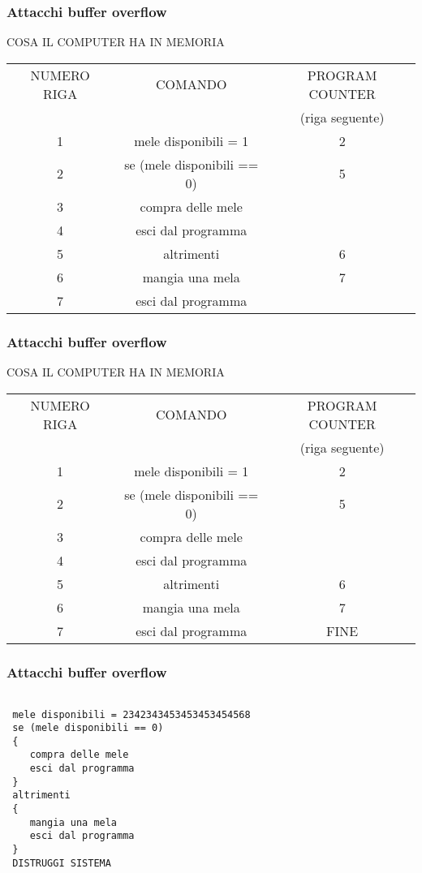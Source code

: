 \documentclass[italian,aspectratio=169]{beamer}
\begin{document}
\begin{frame}
 \frametitle{Attacchi buffer overflow}
 COSA IL COMPUTER HA IN MEMORIA
 \begin{center}
 \begin{tabular}{|c|c|c|}
\hline 
{NUMERO RIGA} & {COMANDO} & {PROGRAM COUNTER}\tabularnewline
{}&{}&{(riga seguente)}\tabularnewline
\hline 
\hline 
{1} & {mele disponibili = 1} & {2}\tabularnewline
\hline
{2} & {se (mele disponibili == 0)} & {5}\tabularnewline
\hline
{3} & {compra delle mele} & {}\tabularnewline
\hline
{4} & {esci dal programma} & {}\tabularnewline
\hline
{5} & {altrimenti} & {6}\tabularnewline
\hline
{6} & {mangia una mela} & {7}\tabularnewline
\hline
{7} & {esci dal programma} & {}\tabularnewline
\hline 
\end{tabular}
\end{center}
\end{frame}

\begin{frame}
 \frametitle{Attacchi buffer overflow}
 COSA IL COMPUTER HA IN MEMORIA
 \begin{center}
 \begin{tabular}{|c|c|c|}
\hline 
{NUMERO RIGA} & {COMANDO} & {PROGRAM COUNTER}\tabularnewline
{}&{}&{(riga seguente)}\tabularnewline
\hline 
\hline 
{1} & {mele disponibili = 1} & {2}\tabularnewline
\hline
{2} & {se (mele disponibili == 0)} & {5}\tabularnewline
\hline
{3} & {compra delle mele} & {}\tabularnewline
\hline
{4} & {esci dal programma} & {}\tabularnewline
\hline
{5} & {altrimenti} & {6}\tabularnewline
\hline
{6} & {mangia una mela} & {7}\tabularnewline
\hline
{7} & {esci dal programma} & {FINE}\tabularnewline
\hline 
\end{tabular}
\end{center}
\end{frame}










\begin{frame}[fragile]
 \frametitle{Attacchi buffer overflow}
\begin{verbatim}

 mele disponibili = 2342343453453453454568  
 se (mele disponibili == 0)
 {
    compra delle mele
    esci dal programma
 }
 altrimenti
 {
    mangia una mela
    esci dal programma
 }
 DISTRUGGI SISTEMA
\end{verbatim}
\end{frame}
\end{document}
